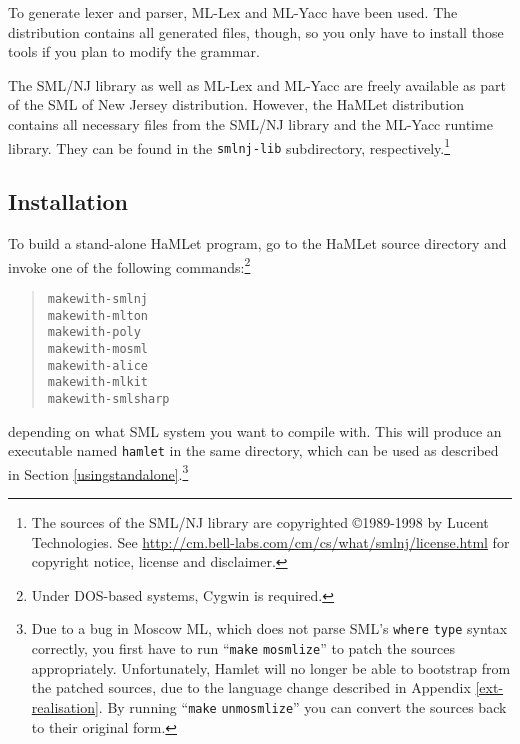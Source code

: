 \documentclass[twoside,titlepage]{article}
\newcommand{\void}[1]{}
\begin{document}
To generate lexer and parser, ML-Lex \cite{mllex} and ML-Yacc \cite{mlyacc} have been used. The distribution contains all generated files, though, so you only have to install those tools if you plan to modify the grammar.

The SML/NJ library as well as ML-Lex and ML-Yacc are freely available as part of the SML of New Jersey distribution. However, the HaMLet distribution contains all necessary files from the SML/NJ library and the ML-Yacc runtime library. They can be found in the {\tt smlnj-lib} subdirectory, respectively.\footnote{The sources of the SML/NJ library are copyrighted \copyright1989-1998 by Lucent Technologies. See \url{http://cm.bell-labs.com/cm/cs/what/smlnj/license.html} for copyright notice, license and disclaimer.}


\subsection{Installation}
\label{installationstandalone}

To build a stand-alone HaMLet program\void{ under Unix-like systems}, go to the HaMLet source directory and invoke one of the following commands:\footnote{Under DOS-based systems, Cygwin is required.}

\begin{quote}
\begin{alltt}
make with-smlnj
make with-mlton
make with-poly
make with-mosml
make with-alice
make with-mlkit
make with-smlsharp
\end{alltt}
\end{quote}

depending on what SML system you want to compile with. This will produce an executable named {\tt hamlet} in the same directory, which can be used as described in Section \ref{usingstandalone}.\footnote{Due to a bug in Moscow ML, which does not parse SML's {\tt where} {\tt type} syntax correctly, you first have to run ``{\tt{make}} {\tt{mosmlize}}'' to patch the sources appropriately. Unfortunately, Hamlet will no longer be able to bootstrap from the patched sources, due to the language change described in Appendix \ref{ext-realisation}. By running ``{\tt{make}} {\tt{unmosmlize}}'' you can convert the sources back to their original form.}

\void{
To compile under DOS-based systems you\void{ can either use the simple-minded {\tt make.bat} batch file that is included in the HaMLet distribution and fakes the commands above, or you} have to install some `make' substitute (e.g.\ via Cygwin) and modify the makefile according to the contained comments. \footnote{This does not properly work for Moscow ML currently.}
}
\end{document}
